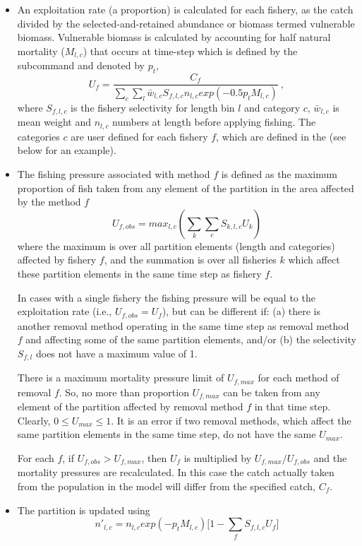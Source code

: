 \begin{itemize}
	\item An exploitation rate (a proportion) is calculated for each fishery, as the catch divided by the selected-and-retained abundance or biomass termed vulnerable biomass. Vulnerable biomass is calculated by accounting for half natural mortality (\(M_{l,c}\)) that occurs at time-step which is defined by the subcommand  and denoted by \(p_t\),
	$$U_{f} = \frac{C_f}{\sum\limits_{c}\sum\limits_l \bar{w}_{l,c} S_{f,l,c} n_{l,c} exp(-0.5 p_t M_{l,c})} \ ,$$
	where \(S_{f,l,c}\) is the fishery selectivity for length bin \(l\) and category \(c\), \(\bar{w}_{l,c}\) is mean weight and \(n_{l,c}\) numbers at length before applying fishing. The categories \(c\) are user defined for each fishery \(f\), which are defined in the  (see below for an example).
	\item The fishing pressure associated with method $f$ is defined as the maximum proportion of fish taken from any element of the partition in the area affected by the method $f$
	$$ U_{f,obs} = max_{l,c}(\sum\limits_k\sum\limits_c S_{k,l,c} U_k) $$
	where the maximum is over all partition elements (length and categories) affected by fishery $f$, and the summation is over all fisheries $k$ which affect these partition elements in the same time step as fishery $f$.
	
	In cases with a single fishery the fishing pressure will be equal to the exploitation rate (i.e., $U_{f,obs} = U_f$), but can be different if: (a) there is another removal method operating in the same time step as removal method $f$ and affecting some of the same partition elements, and/or (b) the selectivity $S_{f,l}$ does not have a maximum value of 1.
	
	There is a maximum mortality pressure limit of $U_{f,max}$ for each method of removal $f$. So, no more than proportion $U_{f,max}$ can be taken from any element of the partition affected by removal method $f$ in that time step. Clearly, $0 \leq U_{max} \leq 1$. It is an error if two removal methods, which affect the same partition elements in the same time step, do not have the same $U_{max}$.
	
	For each $f$, if $U_{f,obs} > U_{f,max}$, then $U_f$ is multiplied by $U_{f,max}/U_{f,obs}$ and the mortality pressures are recalculated. In this case the catch actually taken from the population in the model will differ from the specified catch, $C_f$.
	
	\item The partition is updated using
	$$ n'_{l,c} = n_{l,c} exp(-p_t M_{l,c})\big[1 - \sum_f S_{f,l,c} U_{f} \big] $$
\end{itemize}

